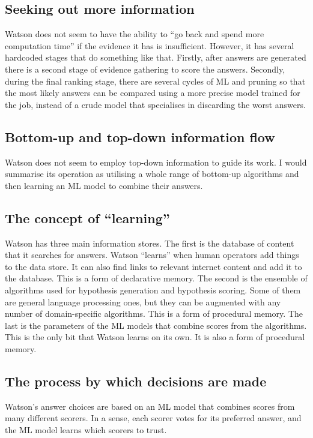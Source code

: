 \documentclass[10pt,a4paper]{article}
\newcommand{\nquote}[1]{``{#1}''}
\begin{document}
\subsection{Seeking out more information}
Watson does not seem to have the ability to \nquote{go back and spend more computation time} if the evidence it has is insufficient. However, it has several hardcoded stages that do something like that. Firstly, after answers are generated there is a second stage of evidence gathering to score the answers. Secondly, during the final ranking stage, there are several cycles of ML and pruning so that the most likely answers can be compared using a more precise model trained for the job, instead of a crude model that specialises in discarding the worst answers.

\subsection{Bottom-up and top-down information flow}
Watson does not seem to employ top-down information to guide its work. I would summarise its operation as utilising a whole range of bottom-up algorithms and then learning an ML model to combine their answers.

\subsection{The concept of \nquote{learning}}
Watson has three main information stores. The first is the database of content that it searches for answers. Watson \nquote{learns} when human operators add things to the data store. It can also find links to relevant internet content and add it to the database. This is a form of declarative memory. The second is the ensemble of algorithms used for hypothesis generation and hypothesis scoring. Some of them are general language processing ones, but they can be augmented with any number of domain-specific algorithms. This is a form of procedural memory. The last is the parameters of the ML models that combine scores from the algorithms. This is the only bit that Watson learns on its own. It is also a form of procedural memory.

\subsection{The process by which decisions are made}
Watson's answer choices are based on an ML model that combines scores from many different scorers. In a sense, each scorer votes for its preferred answer, and the ML model learns which scorers to trust.
\end{document}
